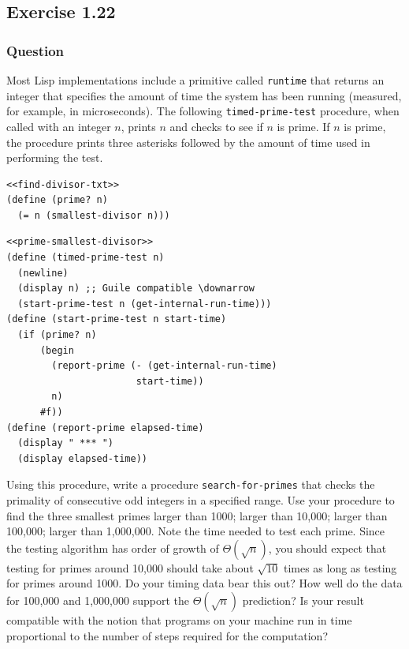 \documentclass[final,fleqn,titlepage,twoside]{article}
\begin{document}
\subsection{Exercise 1.22}
\label{sec:org4e230a5}
\subsubsection{Question}
\label{sec:orgcc2b46d}
Most Lisp implementations include a primitive called \texttt{runtime} that
returns an integer that specifies the amount of time the system has been running
(measured, for example, in microseconds). The following
\texttt{timed-prime-test} procedure, when called with an integer \(n\),
prints \(n\) and checks to see if \(n\) is prime. If \(n\) is prime, the
procedure prints three asterisks followed by the amount of time used in
performing the test.
\begin{verbatim}
<<find-divisor-txt>>
(define (prime? n)
  (= n (smallest-divisor n)))
\end{verbatim}
\begin{verbatim}
<<prime-smallest-divisor>>
(define (timed-prime-test n)
  (newline)
  (display n) ;; Guile compatible \downarrow
  (start-prime-test n (get-internal-run-time)))
(define (start-prime-test n start-time)
  (if (prime? n)
      (begin
        (report-prime (- (get-internal-run-time) 
                       start-time))
        n)
      #f))
(define (report-prime elapsed-time)
  (display " *** ")
  (display elapsed-time))
\end{verbatim}

Using this procedure, write a procedure \texttt{search-for-primes} that
checks the primality of consecutive odd integers in a specified range. Use your
procedure to find the three smallest primes larger than 1000; larger than
10,000; larger than 100,000; larger than 1,000,000. Note the time needed to test
each prime. Since the testing algorithm has order of growth of
\(\Theta(\sqrt{n})\), you should expect that testing for primes around 10,000
should take about \(\sqrt{10}\) times as long as testing for primes around 1000.
Do your timing data bear this out? How well do the data for 100,000 and
1,000,000 support the \(\Theta(\sqrt{n})\) prediction? Is your result compatible
with the notion that programs on your machine run in time proportional to the
number of steps required for the computation?
\end{document}
